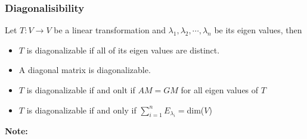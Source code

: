 \documentclass[a4paper, titlepage]{article}
\begin{document}
        \subsubsection{Diagonalisibility}
            Let $T: V \to V$ be a linear transformation and $\lambda_1,
            \lambda_2, \cdots, \lambda_n$ be its eigen values, then
            \begin{itemize}
                \item $T$ is diagonalizable if all of its eigen values
                      are distinct.
                \item A diagonal matrix is diagonalizable.
                \item $T$ is diagonalizable if and onlt if $AM = GM$ for
                      all eigen values of $T$
                \item $T$ is diagonalizable if and only if 
                $\displaystyle\sum_{i=1}^{n} E_{\lambda_i} = $dim($V$)
            \end{itemize}
        \noindent\textbf{Note: }
\end{document}
